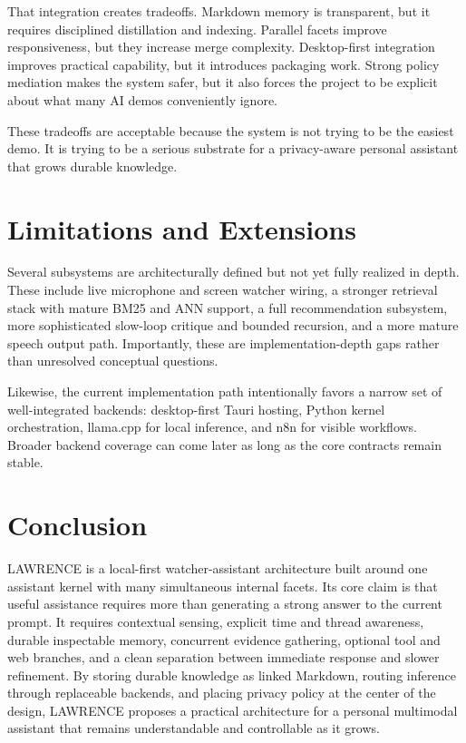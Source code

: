 \documentclass[conference]{IEEEtran}
\begin{document}
That integration creates tradeoffs. Markdown memory is transparent, but it requires disciplined distillation and indexing. Parallel facets improve responsiveness, but they increase merge complexity. Desktop-first integration improves practical capability, but it introduces packaging work. Strong policy mediation makes the system safer, but it also forces the project to be explicit about what many AI demos conveniently ignore.

These tradeoffs are acceptable because the system is not trying to be the easiest demo. It is trying to be a serious substrate for a privacy-aware personal assistant that grows durable knowledge.

\section{Limitations and Extensions}
Several subsystems are architecturally defined but not yet fully realized in depth. These include live microphone and screen watcher wiring, a stronger retrieval stack with mature BM25 and ANN support, a full recommendation subsystem, more sophisticated slow-loop critique and bounded recursion, and a more mature speech output path. Importantly, these are implementation-depth gaps rather than unresolved conceptual questions.

Likewise, the current implementation path intentionally favors a narrow set of well-integrated backends: desktop-first Tauri hosting, Python kernel orchestration, llama.cpp for local inference, and n8n for visible workflows. Broader backend coverage can come later as long as the core contracts remain stable.

\section{Conclusion}
LAWRENCE is a local-first watcher-assistant architecture built around one assistant kernel with many simultaneous internal facets. Its core claim is that useful assistance requires more than generating a strong answer to the current prompt. It requires contextual sensing, explicit time and thread awareness, durable inspectable memory, concurrent evidence gathering, optional tool and web branches, and a clean separation between immediate response and slower refinement. By storing durable knowledge as linked Markdown, routing inference through replaceable backends, and placing privacy policy at the center of the design, LAWRENCE proposes a practical architecture for a personal multimodal assistant that remains understandable and controllable as it grows.

\balance


\end{document}
